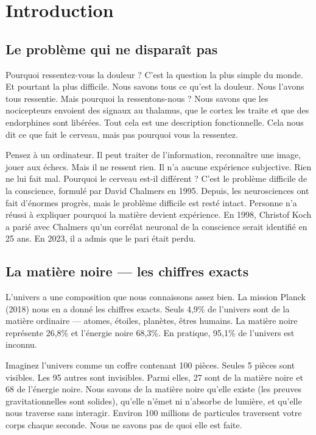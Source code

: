 \section{Introduction}

\subsection{Le problème qui ne disparaît pas}
Pourquoi ressentez-vous la douleur ? C'est la question la plus simple du monde. Et pourtant la plus difficile. Nous savons tous ce qu'est la douleur. Nous l'avons tous ressentie. Mais pourquoi la ressentons-nous ? Nous savons que les nocicepteurs envoient des signaux au thalamus, que le cortex les traite et que des endorphines sont libérées. Tout cela est une description fonctionnelle. Cela nous dit ce que fait le cerveau, mais pas pourquoi vous la ressentez.

Pensez à un ordinateur. Il peut traiter de l'information, reconnaître une image, jouer aux échecs. Mais il ne ressent rien. Il n'a aucune expérience subjective. Rien ne lui fait mal. Pourquoi le cerveau est-il différent ? C'est le problème difficile de la conscience, formulé par David Chalmers en 1995. Depuis, les neurosciences ont fait d'énormes progrès, mais le problème difficile est resté intact. Personne n'a réussi à expliquer pourquoi la matière devient expérience. En 1998, Christof Koch a parié avec Chalmers qu'un corrélat neuronal de la conscience serait identifié en 25 ans. En 2023, il a admis que le pari était perdu.

\subsection{La matière noire --- les chiffres exacts}
L'univers a une composition que nous connaissons assez bien. La mission Planck (2018) nous en a donné les chiffres exacts. Seuls 4,9\% de l'univers sont de la matière ordinaire --- atomes, étoiles, planètes, êtres humains. La matière noire représente 26,8\% et l'énergie noire 68,3\%. En pratique, 95,1\% de l'univers est inconnu.

Imaginez l'univers comme un coffre contenant 100 pièces. Seules 5 pièces sont visibles. Les 95 autres sont invisibles. Parmi elles, 27 sont de la matière noire et 68 de l'énergie noire. Nous savons de la matière noire qu'elle existe (les preuves gravitationnelles sont solides), qu'elle n'émet ni n'absorbe de lumière, et qu'elle nous traverse sans interagir. Environ 100 millions de particules traversent votre corps chaque seconde. Nous ne savons pas de quoi elle est faite.

